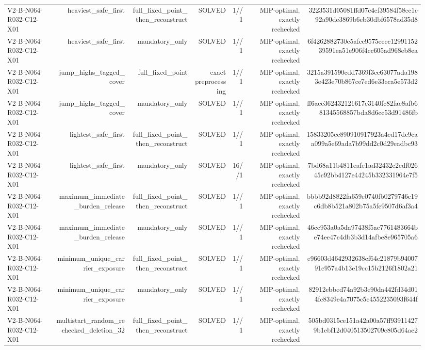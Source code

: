 {\begin{longtable}{lrrrrrr}
V2-B-N064-R032-C12-X01 & heaviest\_safe\_first & full\_fixed\_point\_then\_reconstruct & SOLVED & 1//1 & MIP-optimal, exactly rechecked & 3223531d05081ffd07c4ef39584f58ee1c92a90de3869b6eb30dbf6578ad35d8 \\
V2-B-N064-R032-C12-X01 & heaviest\_safe\_first & mandatory\_only & SOLVED & 1//1 & MIP-optimal, exactly rechecked & 6f4262882730c5afcc9575ecec1299115239591ea51e906f4cc605ad968eb8ea \\
V2-B-N064-R032-C12-X01 & jump\_highs\_tagged\_cover & full\_fixed\_point & exact preprocessing & 1//1 & MIP-optimal, exactly rechecked & 3215a391590cdd7369f3ce63077ada1983e423e70b867ce7ed6e33eca5e573d2 \\
V2-B-N064-R032-C12-X01 & jump\_highs\_tagged\_cover & mandatory\_only & SOLVED & 1//1 & MIP-optimal, exactly rechecked & ff6aee362432121617c3140fc82fac8afb681345568857bda8d6cc53d91486fb \\
V2-B-N064-R032-C12-X01 & lightest\_safe\_first & full\_fixed\_point\_then\_reconstruct & SOLVED & 1//1 & MIP-optimal, exactly rechecked & 15833205cc890910917923a4ed17de9eaa099a5e69ada7b99dd2c0d29eadbc93 \\
V2-B-N064-R032-C12-X01 & lightest\_safe\_first & mandatory\_only & SOLVED & 16//1 & MIP-optimal, exactly rechecked & 7bd68a11b4811eafe1ad32432e2cdf02645c92bb4127e44245b332331964e7f5 \\
V2-B-N064-R032-C12-X01 & maximum\_immediate\_burden\_release & full\_fixed\_point\_then\_reconstruct & SOLVED & 1//1 & MIP-optimal, exactly rechecked & bbbb92d8822fa659e0740fb0279746c19c6db8b521a802b75a5fc9507d6af3a4 \\
V2-B-N064-R032-C12-X01 & maximum\_immediate\_burden\_release & mandatory\_only & SOLVED & 1//1 & MIP-optimal, exactly rechecked & 46cc953a0a5da97438f5ac7761483664be74ee47c4db3b3d14afbe8e965705a6 \\
V2-B-N064-R032-C12-X01 & minimum\_unique\_carrier\_exposure & full\_fixed\_point\_then\_reconstruct & SOLVED & 1//1 & MIP-optimal, exactly rechecked & e96603d4642932638cf64c21879b9400791e957a4b13e19cc15b2126f1802a21 \\
V2-B-N064-R032-C12-X01 & minimum\_unique\_carrier\_exposure & mandatory\_only & SOLVED & 1//1 & MIP-optimal, exactly rechecked & 82912ebbed74a92b3e90da442fd34d014fc8349e4a7075c5c4552235093f644f \\
V2-B-N064-R032-C12-X01 & multistart\_random\_rechecked\_deletion\_32 & full\_fixed\_point\_then\_reconstruct & SOLVED & 1//1 & MIP-optimal, exactly rechecked & 505bd0315ce151a42a00a57ff939114279b1ebf12d040513502709e805d64ae2 \\

\end{longtable}}
